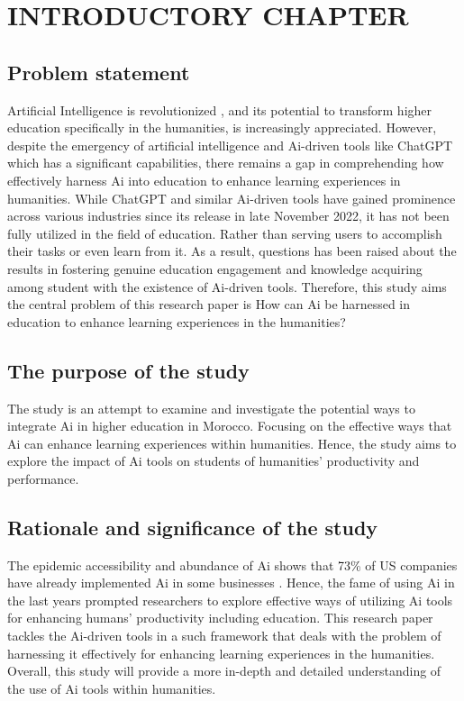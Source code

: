 \chapter{INTRODUCTORY CHAPTER}
\section{Problem statement}
\justifying
Artificial Intelligence is revolutionized , and its potential
to transform higher education specifically in the humanities, is increasingly
appreciated. However, despite the emergency of artificial intelligence and
Ai-driven tools like ChatGPT which has a significant capabilities,
there remains a gap in comprehending how effectively harness Ai into
education to enhance learning experiences in humanities. While ChatGPT
and similar Ai-driven tools have gained prominence across various
industries since its release in late November 2022, it has not been
fully utilized in the field of education. Rather than serving users
to accomplish their tasks or even learn from it. As a result, questions
has been raised about the results in fostering genuine education engagement
and knowledge acquiring among student with the existence of Ai-driven tools. Therefore, this study aims
the central problem of this research paper is How can Ai be harnessed
in education to enhance learning experiences in the humanities?
\section{The purpose of the study}
\justifying
The study is an attempt to examine and investigate the potential ways to integrate Ai in higher education in Morocco.
Focusing on the effective ways that Ai can enhance learning experiences within humanities. Hence, the study aims to
explore the impact of Ai tools on students of humanities' productivity and performance.
\section{Rationale and significance of the study}
\justifying
The epidemic accessibility and abundance of Ai shows that 73\% of US companies have already
implemented Ai in some businesses \citep{pricewaterhousecoopers_2024_2024} .
Hence, the fame of using Ai in the last years prompted researchers to explore effective ways of utilizing Ai tools
for enhancing humans' productivity including education. This research paper tackles the Ai-driven tools in a such framework that 
deals with the problem of harnessing it effectively for enhancing learning experiences in the humanities.
Overall, this study will provide a more in-depth and detailed understanding of the use of Ai tools within humanities.

